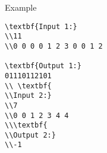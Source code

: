 Example
\begin{verbatim}
\textbf{Input 1:}
\\11
\\0 0 0 0 1 2 3 0 0 1 2

\textbf{Output 1:}
01110112101
\\ \textbf{
\\Input 2:}
\\7
\\0 0 1 2 3 4 4
\\\textbf{
\\Output 2:}
\\-1\end{verbatim}